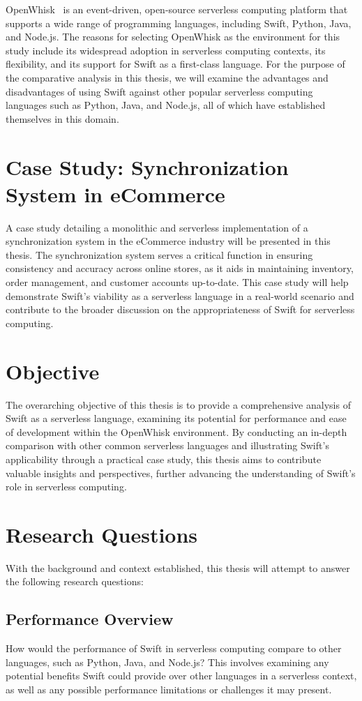 OpenWhisk~\cite{openwhisk2023} is an event-driven, open-source serverless computing platform that supports a wide range of programming languages, including Swift, Python, Java, and Node.js. The reasons for selecting OpenWhisk as the environment for this study include its widespread adoption in serverless computing contexts, its flexibility, and its support for Swift as a first-class language. For the purpose of the comparative analysis in this thesis, we will examine the advantages and disadvantages of using Swift against other popular serverless computing languages such as Python, Java, and Node.js, all of which have established themselves in this domain.

\section{Case Study: Synchronization System in eCommerce}

A case study detailing a monolithic and serverless implementation of a synchronization system in the eCommerce industry will be presented in this thesis. The synchronization system serves a critical function in ensuring consistency and accuracy across online stores, as it aids in maintaining inventory, order management, and customer accounts up-to-date. This case study will help demonstrate Swift's viability as a serverless language in a real-world scenario and contribute to the broader discussion on the appropriateness of Swift for serverless computing.
\section{Objective}

The overarching objective of this thesis is to provide a comprehensive analysis of Swift as a serverless language, examining its potential for performance and ease of development within the OpenWhisk environment. By conducting an in-depth comparison with other common serverless languages and illustrating Swift's applicability through a practical case study, this thesis aims to contribute valuable insights and perspectives, further advancing the understanding of Swift's role in serverless computing.
\section{Research Questions}
With the background and context established, this thesis will attempt to answer the following research questions:

\subsection{Performance Overview}
How would the performance of Swift in serverless computing compare to other languages, such as Python, Java, and Node.js? This involves examining any potential benefits Swift could provide over other languages in a serverless context, as well as any possible performance limitations or challenges it may present.

